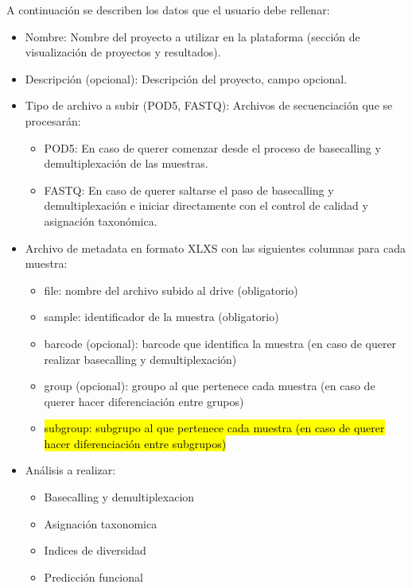 A continuación se describen los datos que el usuario debe rellenar:

\begin{itemize}
    \item Nombre: Nombre del proyecto a utilizar en la plataforma (sección de visualización de proyectos y resultados).
    \item Descripción (opcional): Descripción del proyecto, campo opcional.
    \item Tipo de archivo a subir (POD5, FASTQ): Archivos de secuenciación que se procesarán:
    \begin{itemize}
        \item POD5: En caso de querer comenzar desde el proceso de basecalling y demultiplexación de las muestras.
        \item FASTQ: En caso de querer saltarse el paso de basecalling y demultiplexación e iniciar directamente con el control de calidad y asignación taxonómica.
    \end{itemize}
    \item Archivo de metadata en formato XLXS con las siguientes columnas para cada muestra:
    \begin{itemize}
        \item file: nombre del archivo subido al drive (obligatorio)
        \item sample: identificador de la muestra (obligatorio)
        \item barcode (opcional): barcode que identifica la muestra (en caso de querer realizar basecalling y demultiplexación)
        \item group (opcional): groupo al que pertenece cada muestra (en caso de querer hacer diferenciación entre grupos)
        \item \hl{subgroup: subgrupo al que pertenece cada muestra (en caso de querer hacer diferenciación entre subgrupos)}
    \end{itemize}
    \item Análisis a realizar:
    \begin{itemize}
        \item Basecalling y demultiplexacion
        \item Asignación taxonomica
        \item Indices de diversidad
        \item Predicción funcional
    \end{itemize}
\end{itemize}


